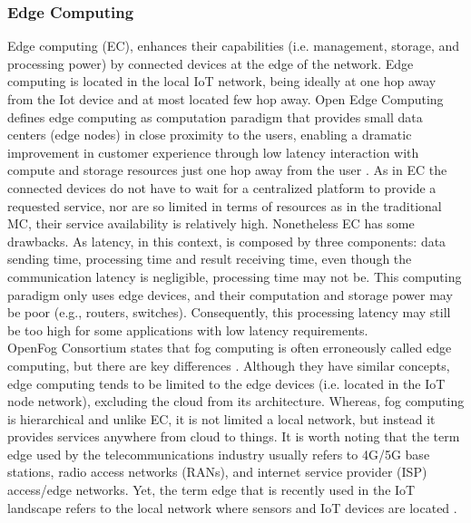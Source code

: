\subsubsection{Edge Computing}
Edge computing (EC), enhances their capabilities (i.e. management, storage, and processing power) by connected devices at the edge of the network. Edge computing is located in the local IoT network, being ideally at one hop away from the Iot device and at most located few hop away. Open Edge Computing defines edge computing as computation paradigm that provides small data centers (edge nodes) in close proximity to the users, enabling a dramatic improvement in customer experience through low latency interaction with compute and storage resources just one hop away from the user \cite{OpenEdge73:online}. As in EC the connected devices do not have to wait for a centralized platform to provide a requested service, nor are so limited in terms of resources as in the traditional MC, their service availability is relatively high. Nonetheless EC has some drawbacks. As latency, in this context, is composed by three components: data sending time, processing time and result receiving time, even though the communication latency is negligible, processing time may not be. This computing paradigm only uses edge devices, and their computation and storage power may be poor (e.g., routers, switches). Consequently, this processing latency may still be too high for some applications with low latency requirements.\\
\noindent\tab OpenFog Consortium states that fog computing is often erroneously called edge computing, but there are key differences \cite{OpenFog0208}. Although they have similar concepts, edge computing tends to be limited to the edge devices (i.e. located in the IoT node network), excluding the cloud from its architecture. Whereas, fog computing is hierarchical and unlike EC, it is not limited a local network, but instead it provides services anywhere from cloud to things. It is worth noting that the term edge used by the telecommunications industry usually refers to 4G/5G base stations, radio access networks (RANs), and internet service provider (ISP) access/edge networks. Yet, the term edge that is recently used in the IoT landscape refers to the local network where sensors and IoT devices are located \cite{yousefpour2018all}.

